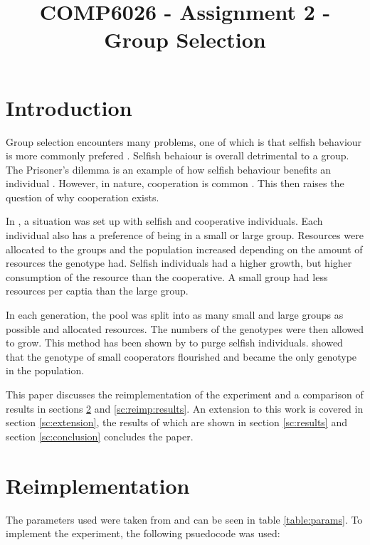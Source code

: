 \documentclass[11pt]{ecsarticle}
\title{COMP6026 - Assignment 2 - Group Selection}
\begin{document}
\maketitle
 
\section{Introduction}

Group selection encounters many problems, one of which is that selfish behaviour is more commonly prefered \citep{powers2012efficacy}.
Selfish behaiour is overall detrimental to a group.
The Prisoner's dilemma is an example of how selfish behaviour benefits an individual \citep{axelrod1987evolution}. 
However, in nature, cooperation is common \citep{szathmary1995major}. 
This then raises the question of why cooperation exists. 

In \cite{powers2007individual}, a situation was set up with selfish and cooperative individuals.
Each individual also has a preference of being in a small or large group. 
Resources were allocated to the groups and the population increased depending on the amount of resources the genotype had. 
Selfish individuals had a higher growth, but higher consumption of the resource than the cooperative.
A small group had less resources per captia than the large group.

In each generation, the pool was split into as many small and large groups as possible and allocated resources.
The numbers of the genotypes were then allowed to grow. 
This method has been shown by \cite{wilson1975theory} to purge selfish individuals. 
\cite{powers2007individual} showed that the genotype of small cooperators flourished and became the only genotype in the population. 


This paper discusses the reimplementation of the experiment \cite{powers2007individual} and a comparison of results in sections \ref{sc:reimplementation} and \ref{sc:reimp:results}.
An extension to this work is covered in section \ref{sc:extension}, the results of which are shown in section \ref{sc:results} and section \ref{sc:conclusion} concludes the paper.


\section{Reimplementation}\label{sc:reimplementation}

The parameters used were taken from \cite{powers2007individual} and can be seen in table \ref{table:params}.
To implement the experiment, the following psuedocode was used:
\end{document}
